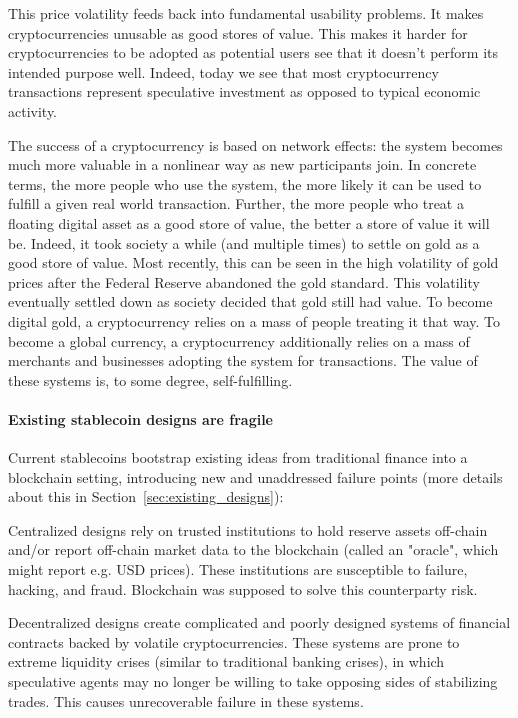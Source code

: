 \documentclass[10pt]{article}
\begin{document}
This price volatility feeds back into fundamental usability problems. It makes cryptocurrencies unusable as good stores of value. This makes it harder for cryptocurrencies to be adopted as potential users see that it doesn't perform its intended purpose well. Indeed, today we see that most cryptocurrency transactions represent speculative investment as opposed to typical economic activity.

The success of a cryptocurrency is based on network effects: the system becomes much more valuable in a nonlinear way as new participants join. In concrete terms, the more people who use the system, the more likely it can be used to fulfill a given real world transaction. Further, the more people who treat a floating digital asset as a good store of value, the better a store of value it will be. Indeed, it took society a while (and multiple times) to settle on gold as a good store of value. Most recently, this can be seen in the high volatility of gold prices after the Federal Reserve abandoned the gold standard. This volatility eventually settled down as society decided that gold still had value. To become digital gold, a cryptocurrency relies on a mass of people treating it that way. To become a global currency, a cryptocurrency additionally relies on a mass of merchants and businesses adopting the system for transactions. The value of these systems is, to some degree, self-fulfilling.


\paragraph{Existing stablecoin designs are fragile}
Current stablecoins bootstrap existing ideas from traditional finance into a blockchain setting, introducing new and unaddressed failure points (more details about this in Section~\ref{sec:existing_designs}):
\begin{compactenum}
\item Centralized designs rely on trusted institutions to hold reserve assets off-chain and/or report off-chain market data to the blockchain (called an "oracle", which might report e.g. USD prices). These institutions are susceptible to failure, hacking, and fraud. Blockchain was supposed to solve this counterparty risk.
\item Decentralized designs create complicated and poorly designed systems of financial contracts backed by volatile cryptocurrencies. These systems are prone to extreme liquidity crises (similar to traditional banking crises), in which speculative agents may no longer be willing to take opposing sides of stabilizing trades. This causes unrecoverable failure in these systems.
\end{compactenum}
\end{document}
